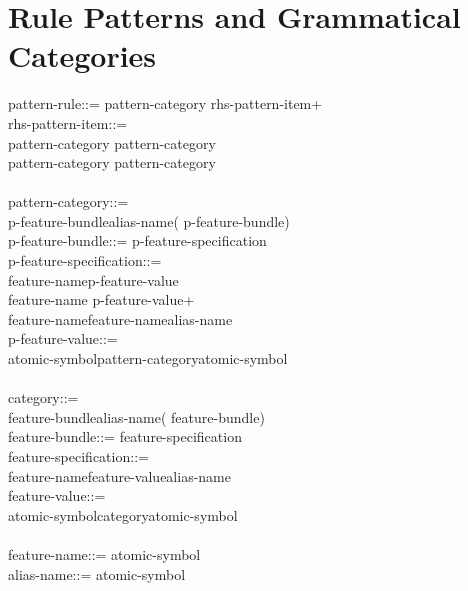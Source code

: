 \section{Rule Patterns and Grammatical Categories}

\begin{display}
\la pattern-rule\ra ::=  \la pattern-category\ra \lit{\twodash\ra} \la rhs-pattern-item\ran+ \\
\la rhs-pattern-item\ra ::=\\
\cont \la pattern-category\ra \alt {} \alt {} \alt \lit{(} \la pattern-category\ra \lit{)} \alt\\
\cont \lit{(} \la pattern-category\ra \lit{)+} \alt \lit{(} \la pattern-category\ra \lit{)*}\\
~\\
\la pattern-category\ra ::=\\
\cont \la p-feature-bundle\ra \alt \la alias-name\ra ( \la p-feature-bundle\ra )\\
\la p-feature-bundle\ra ::= \lit{[} \la p-feature-specification\ran* \lit{]}\\
\la p-feature-specification\ra ::=\\
\cont \la feature-name\ra \la p-feature-value\ra \alt\\
\cont \la feature-name\ra \lit{(} \la p-feature-value\ran+ \lit{)} \alt\\
\cont \la feature-name\ra \alt \littilde\la feature-name\ra \alt \la alias-name\ra\\
\la p-feature-value\ra ::=\\
\cont \la atomic-symbol\ra \alt \la pattern-category\ra \alt {}\la atomic-symbol\ra \alt {} \alt \littilde\\
~\\
\la category\ra ::=\\
\cont \la feature-bundle\ra \alt \la alias-name\ra ( \la feature-bundle\ra )\\
\la feature-bundle\ra ::= \lit{[} \la feature-specification\ran* \lit{]}\\
\la feature-specification\ra ::=\\
\cont \la feature-name\ra \la feature-value\ra \alt \la alias-name\ra\\
\la feature-value\ra ::=\\
\cont \la atomic-symbol\ra \alt \la category\ra \alt {}\la atomic-symbol\ra\\
~\\
\la feature-name\ra ::= \la atomic-symbol\ra\\
\la alias-name\ra ::= \la atomic-symbol\ra
\end{display}
